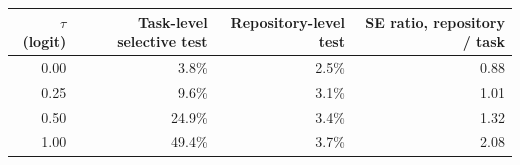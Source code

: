 \begin{tabular}{rrrr}
\toprule
$\tau$ (logit) & Task-level selective test & Repository-level test & SE ratio, repository / task \\
\midrule
0.00 & 3.8\% & 2.5\% & 0.88 \\
0.25 & 9.6\% & 3.1\% & 1.01 \\
0.50 & 24.9\% & 3.4\% & 1.32 \\
1.00 & 49.4\% & 3.7\% & 2.08 \\
\bottomrule
\end{tabular}
